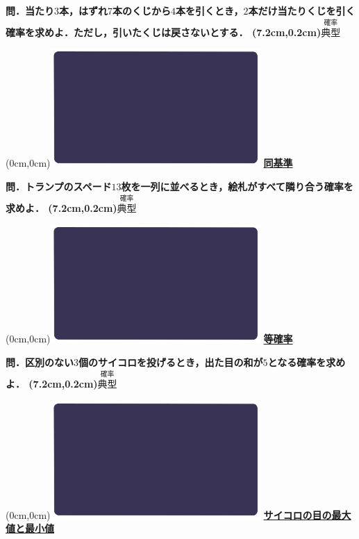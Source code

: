\documentclass[10pt,
fleqn,
dvipdfmx,
uplatex
]{jsarticle}
\begin{document}
\Large 
\bf\boldmath 問．当たり$3$本，はずれ$7$本のくじから$4$本を引くとき，$2$本だけ当たりくじを引く確率を求めよ．ただし，引いたくじは戻さないとする．
\at(7.2cm,0.2cm){\small\color{bradorange}$\overset{\text{確率}}{\text{典型}}$}


\newpage



\at(0cm,0cm){\includegraphics[width=8cm,bb=0 0 1920 1080]{./youtube/thumbnails/templates/smart_background/確率.jpeg}}
{\color{orange}\bf\boldmath\huge\underline{同基準}}\vspace{0.3zw}

\LARGE 
\bf\boldmath 問．トランプのスペード${13}$枚を一列に並べるとき，絵札がすべて隣り合う確率を求めよ．
\at(7.2cm,0.2cm){\small\color{bradorange}$\overset{\text{確率}}{\text{典型}}$}


\newpage



\at(0cm,0cm){\includegraphics[width=8cm,bb=0 0 1920 1080]{./youtube/thumbnails/templates/smart_background/確率.jpeg}}
{\color{orange}\bf\boldmath\huge\underline{等確率}}\vspace{0.3zw}

\LARGE 
\bf\boldmath 問．区別のない$3$個のサイコロを投げるとき，出た目の和が$5$となる確率を求めよ．
\at(7.2cm,0.2cm){\small\color{bradorange}$\overset{\text{確率}}{\text{典型}}$}


\newpage



\at(0cm,0cm){\includegraphics[width=8cm,bb=0 0 1920 1080]{./youtube/thumbnails/templates/smart_background/確率.jpeg}}
{\color{orange}\bf\boldmath\Large\underline{サイコロの目の最大値と最小値}}\vspace{0.3zw}
\end{document}
